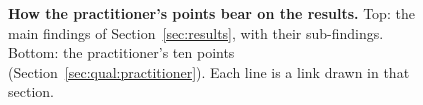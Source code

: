 \begin{landscape}
\begin{figure}[p]
\centering
{}
\caption{{\color{blue}\textbf{How the practitioner's points bear on the results.} Top: the main findings of Section~\ref{sec:results}, with their sub-findings. Bottom: the practitioner's ten points (Section~\ref{sec:qual:practitioner}). Each line is a link drawn in that section.}}
\label{fig:links-map}
\end{figure}
\end{landscape}

